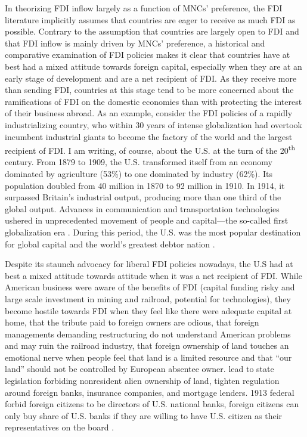 In theorizing FDI inflow largely as a function of MNCs' preference, the FDI
literature implicitly assumes that countries are eager to receive as much FDI as
possible. 
Contrary to the assumption that countries are largely open to FDI and that FDI
inflow is mainly driven by MNCs' preference, a historical and comparative
examination of FDI policies makes it clear that countries have at best had a
mixed attitude towards foreign capital, especially when they are at an early
stage of development and are a net recipient of FDI. As they receive more than
sending FDI, countries at this stage tend to be more concerned about the
ramifications of FDI on the domestic economies than with protecting the interest
of their business abroad. As an example, consider the FDI policies of a rapidly
industrializing country, who within 30 years of intense globalization had
overtook incumbent industrial giants to become the factory of the world and the
largest recipient of FDI. I am writing, of course, about the U.S. at the turn of
the 20\textsuperscript{th} century. From 1879 to 1909, the U.S. transformed
itself from an economy dominated by agriculture (53\%) to one dominated by
industry (62\%). Its population doubled from 40 million in 1870 to 92 million in
1910. In 1914, it surpassed Britain's industrial output, producing more than one
third of the global output. Advances in communication and transportation
technologies ushered in unprecedented movement of people and capital---the
so-called first globalization era \citep{Estevadeordal2003}. During this period,
the U.S. was the most popular destination for global capital and the world's
greatest debtor nation \citep[part II]{Wilkins1989}.

Despite its staunch advocacy for liberal FDI policies nowadays, the U.S had at
best a mixed attitude towards attitude when it was a net recipient of FDI. While
American business were aware of the benefits of FDI (capital funding risky and
large scale investment in mining and railroad, potential for technologies), they
become hostile towards FDI when they feel like there were adequate capital at
home, that the tribute paid to foreign owners are odious, that foreign
managements demanding restructuring do not understand American problems and may
ruin the railroad industry, that foreign ownership of land touches an emotional
nerve when people feel that land is a limited resource and that ``our land''
should not be controlled by European absentee owner. lead to state legislation
forbiding nonresident alien ownership of land, tighten regulation around foreign
banks, insurance companies, and mortgage lenders. 1913 federal forbid foreign
citizens to be directors of U.S. national banks, foreign citizens can only buy
share of U.S. banks if they are willing to have U.S. citizen as their
representatives on the board \citep{Wilkins1989}.

